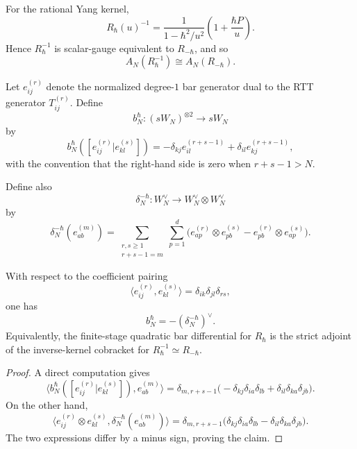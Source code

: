\begin{corollary}
\label{cor:inverse-kernel-sign-reversal}
For the rational Yang kernel,
\[
R_\hbar(u)^{-1}
=
\frac{1}{1-\hbar^2/u^2}\left(1+\frac{\hbar P}{u}\right).
\]
Hence $R_\hbar^{-1}$ is scalar-gauge equivalent to $R_{-\hbar}$, and so
\[
A_N(R_\hbar^{-1})\cong A_N(R_{-\hbar}).
\]
\end{corollary}

\begin{definition}
\label{def:finite-stage-bar-corestriction}
Let $e_{ij}^{(r)}$ denote the normalized degree-$1$ bar generator dual to the
RTT generator $T_{ij}^{(r)}$. Define
\[
b_N^\hbar\colon (sW_N)^{\otimes 2}\to sW_N
\]
by
\[
b_N^\hbar([e_{ij}^{(r)}|e_{kl}^{(s)}])
=
-\delta_{kj}e_{il}^{(r+s-1)}+\delta_{il}e_{kj}^{(r+s-1)},
\]
with the convention that the right-hand side is zero when $r+s-1>N$.

Define also
\[
\delta_N^{-\hbar}\colon W_N^\vee\to W_N^\vee\otimes W_N^\vee
\]
by
\[
\delta_N^{-\hbar}(e_{ab}^{(m)})
=
\sum_{\substack{r,s\ge 1\\r+s-1=m}}\sum_{p=1}^d
\bigl(e_{ap}^{(r)}\otimes e_{pb}^{(s)}-e_{pb}^{(r)}\otimes e_{ap}^{(s)}\bigr).
\]
\end{definition}

\begin{theorem}
\label{thm:finite-stage-rtt-adjointness}
With respect to the coefficient pairing
\[
\langle e_{ij}^{(r)},e_{kl}^{(s)}\rangle
=\delta_{ik}\delta_{jl}\delta_{rs},
\]
one has
\[
b_N^\hbar=-(\delta_N^{-\hbar})^\vee.
\]
Equivalently, the finite-stage quadratic bar differential for $R_\hbar$ is the
strict adjoint of the inverse-kernel cobracket for
$R_\hbar^{-1}\simeq R_{-\hbar}$.
\end{theorem}

\begin{proof}
A direct computation gives
\[
\bigl\langle b_N^\hbar([e_{ij}^{(r)}|e_{kl}^{(s)}]),e_{ab}^{(m)}\bigr\rangle
=
\delta_{m,r+s-1}
\bigl(-\delta_{kj}\delta_{ia}\delta_{lb}
+\delta_{il}\delta_{ka}\delta_{jb}\bigr).
\]
On the other hand,
\[
\bigl\langle e_{ij}^{(r)}\otimes e_{kl}^{(s)},\delta_N^{-\hbar}(e_{ab}^{(m)})\bigr\rangle
=
\delta_{m,r+s-1}
\bigl(\delta_{kj}\delta_{ia}\delta_{lb}
-\delta_{il}\delta_{ka}\delta_{jb}\bigr).
\]
The two expressions differ by a minus sign, proving the claim.
\end{proof}

